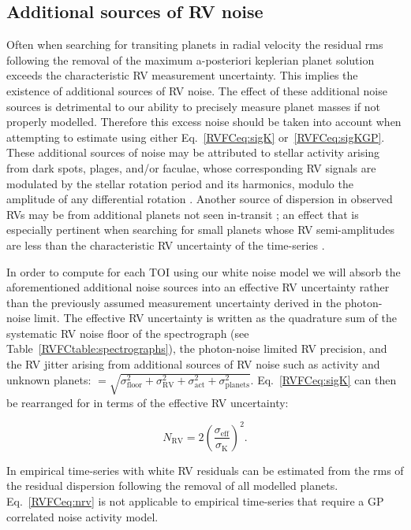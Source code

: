 \subsection{Additional sources of RV noise} \label{RVFCsect:noise}
Often when searching for transiting planets in radial velocity the residual rms following the
removal of the maximum a-posteriori keplerian planet
solution exceeds the characteristic RV measurement uncertainty.
This implies the existence of additional sources of RV noise.
The effect of these additional noise sources is detrimental to our ability to
precisely measure planet masses if not properly modelled. Therefore this excess noise should be taken into
account when attempting to estimate \sigK{} using either Eq.~\ref{RVFCeq:sigK} or~\ref{RVFCeq:sigKGP}.
These additional sources of noise may be
attributed to stellar activity arising from dark spots, plages, and/or faculae, whose corresponding RV
signals are modulated by the stellar rotation period and its harmonics, modulo the amplitude of any differential
rotation \citep[e.g.][]{forveille09, bonfils13, delfosse13b}.
Another source of dispersion in observed RVs may be
from additional planets not seen in-transit \citep[e.g.][]{christiansen17, cloutier17b, bonfils18};
an effect that is especially pertinent when searching for small planets whose RV semi-amplitudes are
less than the characteristic RV uncertainty of the time-series \citep[e.g.][]{astudillodefru17a}.

In order to compute \nrv{} for each TOI using our white noise model we will
absorb the aforementioned additional noise sources into an effective RV uncertainty \sigeff{} rather than the
previously assumed measurement uncertainty derived in the photon-noise limit. The effective RV uncertainty is
written as the quadrature sum of the systematic RV noise floor of the spectrograph \sigfloor{}
(see Table~\ref{RVFCtable:spectrographs}), the photon-noise limited RV precision, and the RV jitter arising from
additional sources of RV noise such as activity and unknown planets: \sigeff{}
$=\sqrt{\sigma_{\text{floor}}^2+\sigma_{\text{RV}}^2+\sigma_{\text{act}}^2 + \sigma_{\text{planets}}^2}$.
Eq.~\ref{RVFCeq:sigK} can then be rearranged for \nrv{} in terms of the effective RV uncertainty:

\begin{equation}
  N_{\text{RV}} = 2 \left( \frac{\sigma_{\text{eff}}}{\sigma_{\text{K}}} \right)^2.
  \label{RVFCeq:nrv}
\end{equation}

\noindent In empirical time-series with white RV residuals
\sigeff{} can be estimated from the rms of the residual dispersion following the removal of
all modelled planets.
Eq.~\ref{RVFCeq:nrv} is not applicable to 
empirical time-series that require a GP correlated noise activity model.

